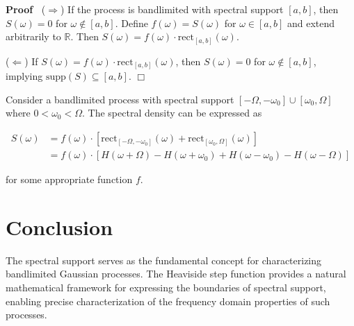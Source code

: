 \documentclass{article}
\newcommand{\nin}{\not\in}
\newenvironment{proof}{\noindent\textbf{Proof\ }}{\hspace*{\fill}$\Box$\medskip}
\begin{document}
\begin{proof}
  ($\Rightarrow$) If the process is bandlimited with spectral support $[a,
  b]$, then $S (\omega) = 0$ for $\omega \nin [a, b]$. Define $f (\omega) = S
  (\omega)$ for $\omega \in [a, b]$ and extend arbitrarily to $\mathbb{R}$.
  Then $S (\omega) = f (\omega) \cdot \mathrm{rect}_{[a, b]} (\omega)$.
  
  ($\Leftarrow$) If $S (\omega) = f (\omega) \cdot \mathrm{rect}_{[a, b]}
  (\omega)$, then $S (\omega) = 0$ for $\omega \nin [a, b]$, implying
  $\mathrm{supp} (S) \subseteq [a, b]$.
\end{proof}

\begin{example}
   Consider a bandlimited process with spectral support $[-
  \Omega, - \omega_0] \cup [\omega_0, \Omega]$ where $0 < \omega_0 < \Omega$.
  The spectral density can be expressed as
  
  \begin{align}
    S (\omega) & = f (\omega) \cdot [\mathrm{rect}_{[- \Omega, - \omega_0]}
    (\omega) + \mathrm{rect}_{[\omega_0, \Omega]} (\omega)] \\
    & = f (\omega) \cdot [H (\omega + \Omega) - H (\omega + \omega_0) + H
    (\omega - \omega_0) - H (\omega - \Omega)] 
  \end{align}
  
  for some appropriate function $f$.
\end{example}

\section{Conclusion}

The spectral support serves as the fundamental concept for characterizing
bandlimited Gaussian processes. The Heaviside step function provides a natural
mathematical framework for expressing the boundaries of spectral support,
enabling precise characterization of the frequency domain properties of such
processes.
\end{document}
